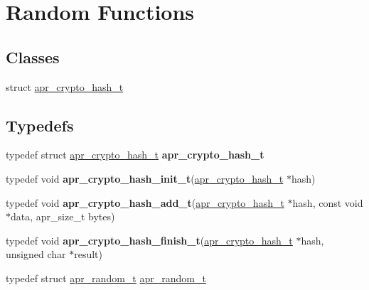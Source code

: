 \hypertarget{group__apr__random}{}\section{Random Functions}
\label{group__apr__random}
\subsection*{Classes}
\begin{DoxyCompactItemize}
\item 
struct \mbox{\hyperlink{structapr__crypto__hash__t}{apr\+\_\+crypto\+\_\+hash\+\_\+t}}
\end{DoxyCompactItemize}
\subsection*{Typedefs}
\begin{DoxyCompactItemize}
\item 
\mbox{\label{group__apr__random_ga30fbaf80424a9f1a0e9cc51072f65127}} 
typedef struct \mbox{\hyperlink{structapr__crypto__hash__t}{apr\+\_\+crypto\+\_\+hash\+\_\+t}} {\bfseries apr\+\_\+crypto\+\_\+hash\+\_\+t}
\item 
\mbox{\label{group__apr__random_gad2775bc1cdb376d9dec0e97283b4bdd9}} 
typedef void {\bfseries apr\+\_\+crypto\+\_\+hash\+\_\+init\+\_\+t}(\mbox{\hyperlink{structapr__crypto__hash__t}{apr\+\_\+crypto\+\_\+hash\+\_\+t}} $\ast$hash)
\item 
\mbox{\label{group__apr__random_ga2f8a4fb18078a76357327ea55936c1ea}} 
typedef void {\bfseries apr\+\_\+crypto\+\_\+hash\+\_\+add\+\_\+t}(\mbox{\hyperlink{structapr__crypto__hash__t}{apr\+\_\+crypto\+\_\+hash\+\_\+t}} $\ast$hash, const void $\ast$data, apr\+\_\+size\+\_\+t bytes)
\item 
\mbox{\label{group__apr__random_gab70ea9133870efdb5532d20d4bcf7442}} 
typedef void {\bfseries apr\+\_\+crypto\+\_\+hash\+\_\+finish\+\_\+t}(\mbox{\hyperlink{structapr__crypto__hash__t}{apr\+\_\+crypto\+\_\+hash\+\_\+t}} $\ast$hash, unsigned char $\ast$result)
\item 
typedef struct \mbox{\hyperlink{group__apr__random_ga33073741e56b1bafe52ba58cefcbbf96}{apr\+\_\+random\+\_\+t}} \mbox{\hyperlink{group__apr__random_ga33073741e56b1bafe52ba58cefcbbf96}{apr\+\_\+random\+\_\+t}}
\end{DoxyCompactItemize}
